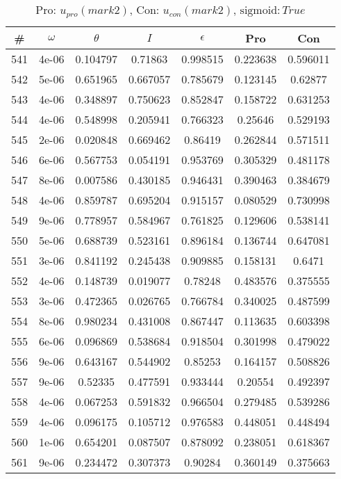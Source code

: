 \newpage
\begin{table}
\caption{Pro: $u_{pro} (mark 2)$, Con: $u_{con} (mark 2)$, $\mathrm{sigmoid}: True$}
\begin{tabular*}{\linewidth}{c|c|c|c|c|c|c}
\# & $\omega$ & $\theta$ & $I$ & $\epsilon$ & Pro & Con \\
\hline
541 & 4e-06 & 0.104797 & 0.71863 & 0.998515 & 0.223638 & 0.596011\\
542 & 5e-06 & 0.651965 & 0.667057 & 0.785679 & 0.123145 & 0.62877\\
543 & 4e-06 & 0.348897 & 0.750623 & 0.852847 & 0.158722 & 0.631253\\
544 & 4e-06 & 0.548998 & 0.205941 & 0.766323 & 0.25646 & 0.529193\\
545 & 2e-06 & 0.020848 & 0.669462 & 0.86419 & 0.262844 & 0.571511\\
546 & 6e-06 & 0.567753 & 0.054191 & 0.953769 & 0.305329 & 0.481178\\
547 & 8e-06 & 0.007586 & 0.430185 & 0.946431 & 0.390463 & 0.384679\\
548 & 4e-06 & 0.859787 & 0.695204 & 0.915157 & 0.080529 & 0.730998\\
549 & 9e-06 & 0.778957 & 0.584967 & 0.761825 & 0.129606 & 0.538141\\
550 & 5e-06 & 0.688739 & 0.523161 & 0.896184 & 0.136744 & 0.647081\\
551 & 3e-06 & 0.841192 & 0.245438 & 0.909885 & 0.158131 & 0.6471\\
552 & 4e-06 & 0.148739 & 0.019077 & 0.78248 & 0.483576 & 0.375555\\
553 & 3e-06 & 0.472365 & 0.026765 & 0.766784 & 0.340025 & 0.487599\\
554 & 8e-06 & 0.980234 & 0.431008 & 0.867447 & 0.113635 & 0.603398\\
555 & 6e-06 & 0.096869 & 0.538684 & 0.918504 & 0.301998 & 0.479022\\
556 & 9e-06 & 0.643167 & 0.544902 & 0.85253 & 0.164157 & 0.508826\\
557 & 9e-06 & 0.52335 & 0.477591 & 0.933444 & 0.20554 & 0.492397\\
558 & 4e-06 & 0.067253 & 0.591832 & 0.966504 & 0.279485 & 0.539286\\
559 & 4e-06 & 0.096175 & 0.105712 & 0.976583 & 0.448051 & 0.448494\\
560 & 1e-06 & 0.654201 & 0.087507 & 0.878092 & 0.238051 & 0.618367\\
561 & 9e-06 & 0.234472 & 0.307373 & 0.90284 & 0.360149 & 0.375663\\

\end{tabular*}
\end{table}
